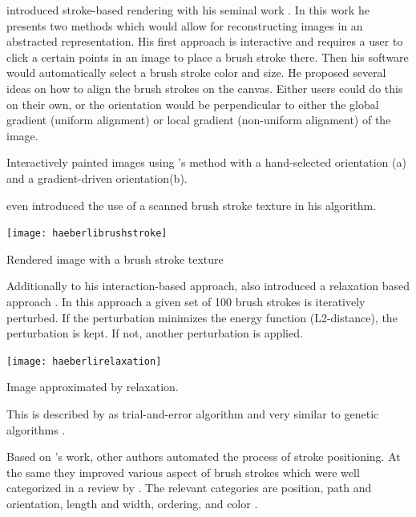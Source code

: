\citeauthor*{paintbynumbers} introduced stroke-based rendering with his seminal work  \cite{paintbynumbers}.
In this work he presents two methods which would allow for reconstructing images in an abstracted representation.
His first approach is interactive and requires a user to click a certain points in an image to place a brush stroke there.
Then his software would automatically select a brush stroke color and size.
He proposed several ideas on how to align the brush strokes on the canvas.
Either users could do this on their own, or the orientation would be perpendicular to either the global gradient (uniform alignment) or local gradient (non-uniform alignment) of the image.
\begin{marginfigure}
    \qquad
    \caption{Interactively painted images using \citeauthor*{paintbynumbers}'s method with a hand-selected orientation (a) and a gradient-driven orientation(b).}
\end{marginfigure}
\citeauthor*{paintbynumbers} even introduced the use of a scanned brush stroke texture in his algorithm.
\begin{marginfigure}
    \texttt{[image: haeberlibrushstroke]}
    \caption{Rendered image with a brush stroke texture}
\end{marginfigure}

Additionally to his interaction-based approach, \citeauthor*{paintbynumbers} also introduced a relaxation based approach \cite{paintbynumbers}.
In this approach a given set of 100 brush strokes is iteratively perturbed.
If the perturbation minimizes the energy function (L2-distance), the perturbation is kept.
If not, another perturbation is applied.
\begin{marginfigure}
    \texttt{[image: haeberlirelaxation]}
    \caption{Image approximated by relaxation.}
\end{marginfigure}
This is described by \citeauthor*{hertzmannreview} as trial-and-error algorithm and very similar to genetic algorithms \cite{hertzmannreview}.

Based on \citeauthor*{paintbynumbers}'s work, other authors automated the process of stroke positioning.
At the same they improved various aspect of brush strokes which were well categorized in a review by \citeauthor*{PRreview}.
The relevant categories are position, path and orientation, length and width, ordering, and color \cite{PRreview}.

